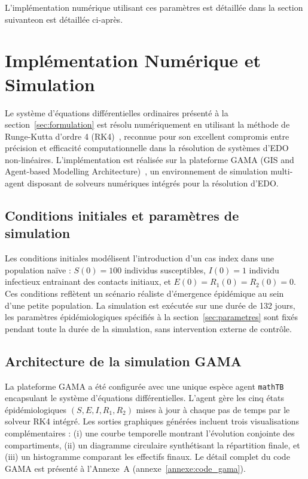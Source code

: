 \documentclass[11pt]{article}
\begin{document}
L'implémentation numérique utilisant ces paramètres est détaillée dans la section suivanteon est détaillée ci-après.


\section{Implémentation Numérique et Simulation}\label{sec:implementation}

Le système d'équations différentielles ordinaires présenté à la section~\ref{sec:formulation} est résolu numériquement en utilisant la méthode de Runge-Kutta d'ordre 4 (RK4)~\cite{butcher2016}, reconnue pour son excellent compromis entre précision et efficacité computationnelle dans la résolution de systèmes d'EDO non-linéaires. L'implémentation est réalisée sur la plateforme GAMA (GIS and Agent-based Modelling Architecture)~\cite{taillandier2019, kasereka2025gama, kasereka2025sma}, un environnement de simulation multi-agent disposant de solveurs numériques intégrés pour la résolution d'EDO.

\subsection{Conditions initiales et paramètres de simulation}

Les conditions initiales modélisent l'introduction d'un cas index dans une population naïve : $S(0) = 100$ individus susceptibles, $I(0) = 1$ individu infectieux entrainant des contacts initiaux, et $E(0) = R_1(0) = R_2(0) = 0$. Ces conditions reflètent un scénario réaliste d'émergence épidémique au sein d'une petite population. La simulation est exécutée sur une durée de 132 jours, les paramètres épidémiologiques spécifiés à la section~\ref{sec:parametres} sont fixés pendant toute la durée de la simulation, sans intervention externe de contrôle.

\subsection{Architecture de la simulation GAMA}

La plateforme GAMA a été configurée avec une unique espèce agent \texttt{mathTB} encapsulant le système d'équations différentielles. L'agent gère les cinq états épidémiologiques $(S, E, I, R_1, R_2)$ mises à jour à chaque pas de temps par le solveur RK4 intégré. Les sorties graphiques générées incluent trois visualisations complémentaires : (i) une courbe temporelle montrant l'évolution conjointe des compartiments, (ii) un diagramme circulaire synthétisant la répartition finale, et (iii) un histogramme comparant les effectifs finaux. Le détail complet du code GAMA est présenté à l'Annexe~A (annexe~\ref{annexe:code_gama}).
\end{document}

